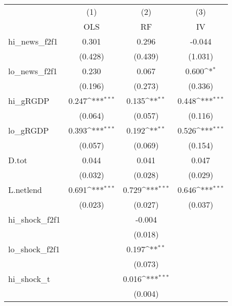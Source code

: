 {
\def\sym#1{\ifmmode^{#1}\else\(^{#1}\)\fi}
\begin{tabular}{l*{3}{c}}
\toprule
            &\multicolumn{1}{c}{(1)}&\multicolumn{1}{c}{(2)}&\multicolumn{1}{c}{(3)}\\
            &\multicolumn{1}{c}{OLS}&\multicolumn{1}{c}{RF}&\multicolumn{1}{c}{IV}\\
\midrule
hi\_news\_f2f1&       0.301         &       0.296         &      -0.044         \\
            &     (0.428)         &     (0.439)         &     (1.031)         \\
\addlinespace
lo\_news\_f2f1&       0.230         &       0.067         &       0.600\sym{*}  \\
            &     (0.196)         &     (0.273)         &     (0.336)         \\
\addlinespace
hi\_gRGDP    &       0.247\sym{***}&       0.135\sym{**} &       0.448\sym{***}\\
            &     (0.064)         &     (0.057)         &     (0.116)         \\
\addlinespace
lo\_gRGDP    &       0.393\sym{***}&       0.192\sym{**} &       0.526\sym{***}\\
            &     (0.057)         &     (0.069)         &     (0.154)         \\
\addlinespace
D.tot       &       0.044         &       0.041         &       0.047         \\
            &     (0.032)         &     (0.028)         &     (0.029)         \\
\addlinespace
L.netlend   &       0.691\sym{***}&       0.729\sym{***}&       0.646\sym{***}\\
            &     (0.023)         &     (0.027)         &     (0.037)         \\
\addlinespace
hi\_shock\_f2f1&                     &      -0.004         &                     \\
            &                     &     (0.018)         &                     \\
\addlinespace
lo\_shock\_f2f1&                     &       0.197\sym{**} &                     \\
            &                     &     (0.073)         &                     \\
\addlinespace
hi\_shock\_t  &                     &       0.016\sym{***}&                     \\
            &                     &     (0.004)         &                     \\

\end{tabular}}

